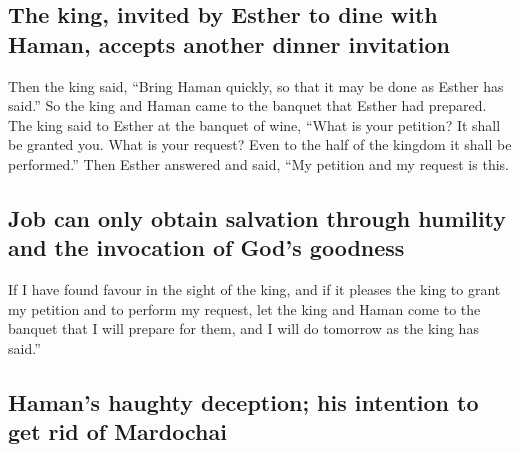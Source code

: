 \hypertarget{the-king-invited-by-esther-to-dine-with-haman-accepts-another-dinner-invitation}{%
\subsection{The king, invited by Esther to dine with Haman, accepts
another dinner
invitation}\label{the-king-invited-by-esther-to-dine-with-haman-accepts-another-dinner-invitation}}

 Then the king said, ``Bring Haman quickly, so that it may
be done as Esther has said.'' So the king and Haman came to the banquet
that Esther had prepared.  The king said to Esther at the
banquet of wine, ``What is your petition? It shall be granted you. What
is your request? Even to the half of the kingdom it shall be
performed.''  Then Esther answered and said, ``My petition
and my request is this.

\hypertarget{job-can-only-obtain-salvation-through-humility-and-the-invocation-of-gods-goodness}{%
\subsection{Job can only obtain salvation through humility and the
invocation of God's
goodness}\label{job-can-only-obtain-salvation-through-humility-and-the-invocation-of-gods-goodness}}

 If I have found favour in the sight of the king, and if
it pleases the king to grant my petition and to perform my request, let
the king and Haman come to the banquet that I will prepare for them, and
I will do tomorrow as the king has said.''

\hypertarget{hamans-haughty-deception-his-intention-to-get-rid-of-mardochai}{%
\subsection{Haman's haughty deception; his intention to get rid of
Mardochai}\label{hamans-haughty-deception-his-intention-to-get-rid-of-mardochai}}

